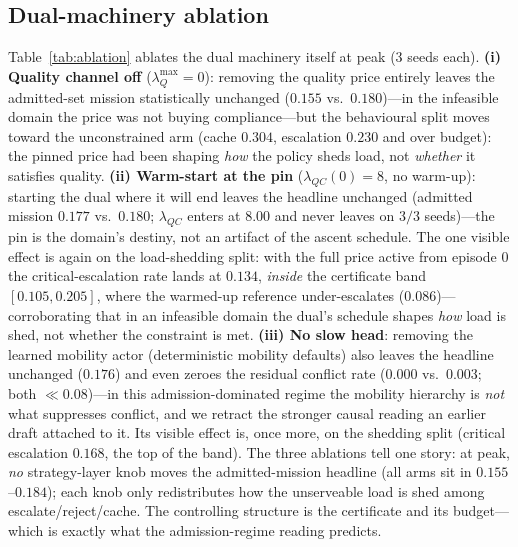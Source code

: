 \subsection{Dual-machinery ablation}\label{sub:m3}
Table~\ref{tab:ablation} ablates the dual machinery itself at peak
($3$ seeds each). \textbf{(i) Quality channel off}
($\lambda^{\max}_{Q}{=}0$): removing the quality price entirely leaves the
admitted-set mission statistically unchanged ($0.155$ vs.\ $0.180$)---in
the infeasible domain the price was not buying compliance---but the
behavioural split moves toward the unconstrained arm (cache $0.304$,
escalation $0.230$ and over budget): the pinned price had been shaping
\emph{how} the policy sheds load, not \emph{whether} it satisfies quality.
\textbf{(ii) Warm-start at the pin} ($\lambda_{QC}(0){=}8$, no warm-up):
starting the dual where it will end leaves the headline unchanged
(admitted mission $0.177$ vs.\ $0.180$; $\lambda_{QC}$ enters at $8.00$
and never leaves on $3/3$ seeds)---the pin is the domain's destiny, not an
artifact of the ascent schedule. The one visible effect is again on the
load-shedding split: with the full price active from episode $0$ the
critical-escalation rate lands at $0.134$, \emph{inside} the
certificate band $[0.105,0.205]$, where the warmed-up reference
under-escalates ($0.086$)---corroborating that in an infeasible domain the
dual's schedule shapes \emph{how} load is shed, not whether the constraint
is met.
\textbf{(iii) No slow head}: removing the learned mobility actor
(deterministic mobility defaults) also leaves the headline unchanged
($0.176$) and even zeroes the residual conflict rate ($0.000$ vs.\
$0.003$; both $\ll0.08$)---in this admission-dominated regime the mobility
hierarchy is \emph{not} what suppresses conflict, and we retract the
stronger causal reading an earlier draft attached to it. Its visible
effect is, once more, on the shedding split (critical escalation $0.168$,
the top of the band). The three ablations tell one story: at peak,
\emph{no} strategy-layer knob moves the admitted-mission headline (all
arms sit in $0.155$--$0.184$); each knob only redistributes how the
unserveable load is shed among escalate/reject/cache. The controlling
structure is the certificate and its budget---which is exactly what the
admission-regime reading predicts.

